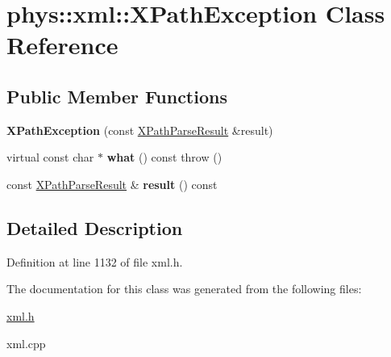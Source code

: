 \hypertarget{classphys_1_1xml_1_1XPathException}{
\section{phys::xml::XPathException Class Reference}
\label{d4/d30/classphys_1_1xml_1_1XPathException}
}
\subsection*{Public Member Functions}
\begin{DoxyCompactItemize}
\item 
\hypertarget{classphys_1_1xml_1_1XPathException_a2c326bac98d78d0816310bfac6c3b68f}{
{\bfseries XPathException} (const \hyperlink{structphys_1_1xml_1_1XPathParseResult}{XPathParseResult} \&result)}
\label{d4/d30/classphys_1_1xml_1_1XPathException_a2c326bac98d78d0816310bfac6c3b68f}

\item 
\hypertarget{classphys_1_1xml_1_1XPathException_a36e9d9daa5c8e2680057b2e1642ed225}{
virtual const char $\ast$ {\bfseries what} () const   throw ()}
\label{d4/d30/classphys_1_1xml_1_1XPathException_a36e9d9daa5c8e2680057b2e1642ed225}

\item 
\hypertarget{classphys_1_1xml_1_1XPathException_a37af29b6a83c06c8f2bf89eace7704fd}{
const \hyperlink{structphys_1_1xml_1_1XPathParseResult}{XPathParseResult} \& {\bfseries result} () const }
\label{d4/d30/classphys_1_1xml_1_1XPathException_a37af29b6a83c06c8f2bf89eace7704fd}

\end{DoxyCompactItemize}


\subsection{Detailed Description}


Definition at line 1132 of file xml.h.



The documentation for this class was generated from the following files:\begin{DoxyCompactItemize}
\item 
\hyperlink{xml_8h}{xml.h}\item 
xml.cpp\end{DoxyCompactItemize}
